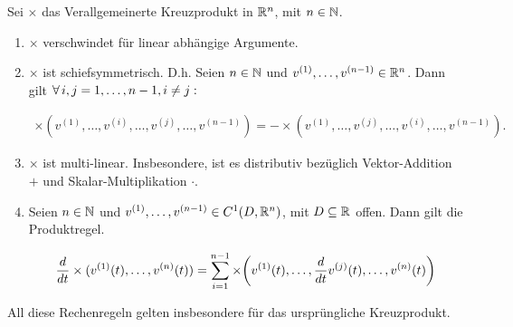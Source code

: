 \begin{lemma*}

Sei $\times$ das Verallgemeinerte Kreuzprodukt in $\mathbb{R}^n$, mit $n \in \mathbb{N}$.

\begin{enumerate}[label = (\roman*)]

  \item
  $\times$ verschwindet für linear abhängige Argumente.

  \item
  $\times$ ist schiefsymmetrisch.
  D.h.
  Seien $n \in \mathbb{N}$ und $v^{(1)}, \ldots, v^{(n-1)} \in \mathbb{R}^n$.
  Dann gilt $\forall \, i, j = 1, \ldots, n-1, i \neq j:$

  \begin{align*}
    \times(v^{(1)}, \ldots, v^{(i)}, \ldots, v^{(j)}, \ldots, v^{(n-1)})
    =
    -
    \times(v^{(1)}, \ldots, v^{(j)}, \ldots, v^{(i)}, \ldots, v^{(n-1)}).
  \end{align*}

  \item
  $\times$ ist multi-linear.
  Insbesondere, ist es distributiv bezüglich Vektor-Addition $+$ und Skalar-Multiplikation $\cdot$.

  \item
  Seien $n \in \mathbb{N}$ und $v^{(1)}, \ldots, v^{(n-1)} \in C^1(D, \mathbb{R}^n)$, mit $D \subseteq \mathbb{R}$ offen.
  Dann gilt die Produktregel.

  \begin{align*}
    \frac{d}{dt}
    \times(v^{(1)}(t), \ldots, v^{(n)}(t))
    =
    \sum_{i=1}^{n-1}
    \times {\left ( 
      v^{(1)}(t),
      \ldots,
      \frac{d}{dt}
      v^{(j)}(t),
      \ldots,
      v^{(n)}(t)
     \right )}
  \end{align*}

\end{enumerate}

All diese Rechenregeln gelten insbesondere für das ursprüngliche Kreuzprodukt.

\end{lemma*}

